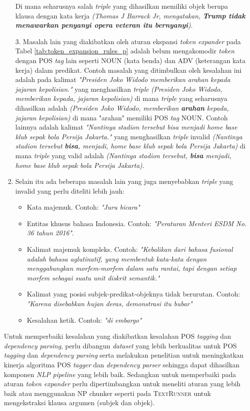 \begin{enumerate}
	Di mana seharusnya salah \textit{triple} yang dihasilkan memiliki objek berupa klausa dengan kata kerja \textit{(Thomas J Barrack Jr, mengatakan, \textbf{Trump tidak menawarkan penyanyi opera veteran itu bernyanyi})}. 
	
	3. Masalah lain yang diakibatkan oleh aturan ekspansi \textit{token expander} pada Tabel \ref{tab:token_expansion_rules_p} adalah belum mengakomodir \textit{token} dengan POS \textit{tag} lain seperti NOUN (kata benda) dan ADV (keterangan kata kerja) dalam predikat. Contoh masalah yang ditimbulkan oleh kesalahan ini adalah pada kalimat \textit{"Presiden Joko Widodo memberikan arahan kepada jajaran kepolisian."} yang menghasilkan \textit{triple} \textit{(Presiden Joko Widodo, memberikan kepada, jajaran kepolisian)} di mana \textit{triple} yang seharusnya dihasilkan adalah \textit{(Presiden Joko Widodo, memberikan \textbf{arahan} kepada, jajaran kepolisian)} di mana "arahan" memiliki POS \textit{tag} NOUN. Contoh lainnya adalah kalimat \textit{"Nantinya stadion tersebut bisa menjadi home base klub sepak bola Persija Jakarta."} yang menghasilkan \textit{triple} invalid \textit{(Nantinya stadion tersebut \textbf{bisa}, menjadi, home base klub sepak bola Persija Jakarta)} di mana \textit{triple} yang valid adalah \textit{(Nantinya stadion tersebut, \textbf{bisa} menjadi, home base klub sepak bola Persija Jakarta)}.
	
	\item Selain itu ada beberapa masalah lain yang juga menyebabkan \textit{triple} yang invalid yang perlu diteliti lebih jauh:
	
	\begin{itemize}
	\item Kata majemuk. Contoh: \textit{"Juru bicara"}
	\item Entitas khusus bahasa Indonesia. Contoh: \textit{"Peraturan Menteri ESDM No. 36 tahun 2016"}.
	\item Kalimat majemuk kompleks. Contoh: \textit{"Kebalikan dari bahasa fusional adalah bahasa aglutinatif, yang membentuk kata-kata dengan menggabungkan morfem-morfem dalam satu rantai, tapi dengan setiap morfem sebagai suatu unit diskrit semantik."}
	\item Kalimat yang posisi subjek-predikat-objeknya tidak berurutan. Contoh: \textit{"Karena disebabkan hujan deras, demonstrasi itu bubar"}
	\item Kesalahan ketik. Contoh: \textit{"di embargo"}
	\end{itemize}
	
\end{enumerate} 

Untuk memperbaiki kesalahan yang diakibatkan kesalahan POS \textit{tagging} dan \textit{dependency parsing}, perlu dibangun \textit{dataset} yang lebih berkualitas untuk POS \textit{tagging} dan \textit{dependency parsing} serta melakukan penelitian untuk meningkatkan kinerja algoritma POS \textit{tagger} dan \textit{dependency parser} sehingga dapat dihasilkan komponen \textit{NLP pipeline} yang lebih baik. Sedangkan untuk memperbaiki pada aturan \textit{token expander} perlu dipertimbangkan untuk meneliti aturan yang lebih baik atau menggunakan NP chunker seperti pada \textsc{TextRunner} \citep{banko2007open} untuk mengekstraksi klausa argumen (subjek dan objek). 
